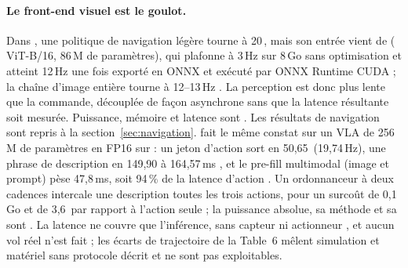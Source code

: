 \paragraph{Le front-end visuel est le goulot.} Dans 
\citep{arxiv-2509.18610-singer-onboard-generalist-vision-language}\pp{}, une politique
de navigation légère tourne à 20\,, mais son entrée vient de  ( ViT-B/16,
86\,M de paramètres), qui plafonne à 3\,Hz sur  8\,Go sans optimisation et
atteint 12\,Hz une fois exporté en ONNX et exécuté par ONNX Runtime CUDA \med ; la
chaîne d'image entière tourne à 12--13\,Hz . La perception est donc plus lente
que la commande, découplée de façon asynchrone sans que la latence résultante soit
mesurée. Puissance, mémoire et latence sont \nr. Les résultats de navigation sont repris à
la section~\ref{sec:navigation}. 
\citep{arxiv-2605.00884-litevla-h-dual-rate-vision}\pp{} fait le même constat sur un VLA de
256\,M de paramètres en FP16 sur  : un jeton d'action sort en 50,65\,
(19,74\,Hz), une phrase de description en 149,90 à 164,57\,ms \med, et le
pre-fill multimodal (image et prompt) pèse 47,8\,ms, soit 94\,\% de la latence d'action
. Un ordonnanceur à deux cadences intercale une description toutes les trois
actions, pour un surcoût de 0,1\,Go et de 3,6\, par rapport à l'action seule
 ; la puissance absolue, sa méthode et sa  sont \nr. La latence ne
couvre que l'inférence, sans capteur ni actionneur , et aucun vol réel n'est
fait  ; les écarts de trajectoire de la Table~6 mêlent simulation et matériel
sans protocole décrit et ne sont pas exploitables.

